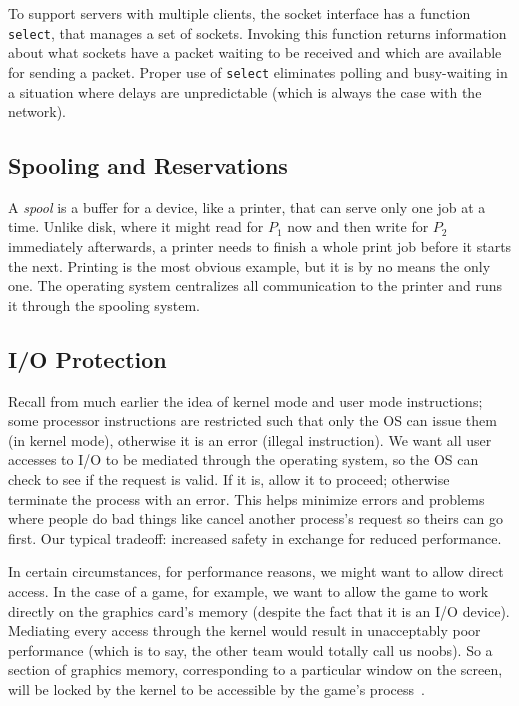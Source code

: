 To support servers with multiple clients, the socket interface has a function \texttt{select}, that manages a set of sockets. Invoking this function returns information about what sockets have a packet waiting to be received and which are available for sending a packet. Proper use of \texttt{select} eliminates polling and busy-waiting in a situation where delays are unpredictable (which is always the case with the network).


\subsection*{Spooling and Reservations}
A \textit{spool} is a buffer for a device, like a printer, that can serve only one job at a time. Unlike disk, where it might read for $P_{1}$ now and then write for $P_{2}$ immediately afterwards, a printer needs to finish a whole print job before it starts the next. Printing is the most obvious example, but it is by no means the only one. The operating system centralizes all communication to the printer and runs it through the spooling system. 

\subsection*{I/O Protection}
Recall from much earlier the idea of kernel mode and user mode instructions; some processor instructions are restricted such that only the OS can issue them (in kernel mode), otherwise it is an error (illegal instruction). We want all user accesses to I/O to be mediated through the operating system, so the OS can check to see if the request is valid. If it is, allow it to proceed; otherwise terminate the process with an error. This helps minimize errors and problems where people do bad things like cancel another process's request so theirs can go first. Our typical tradeoff: increased safety in exchange for reduced performance.

In certain circumstances, for performance reasons, we might want to allow direct access. In the case of a game, for example, we want to allow the game to work directly on the graphics card's memory (despite the fact that it is an I/O device). Mediating every access through the kernel would result in unacceptably poor performance (which is to say, the other team would totally call us noobs). So a section of graphics memory, corresponding to a particular window on the screen, will be locked by the kernel to be accessible by the game's process~\cite{osc}.

